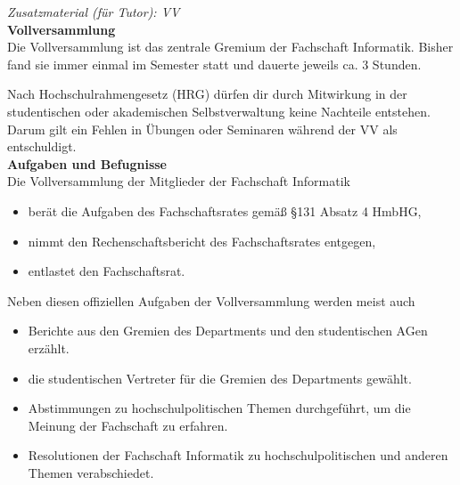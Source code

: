\documentclass[a4paper,11pt]{scrartcl} %
\begin{document}
\begin{framed}
\textit{Zusatzmaterial (für Tutor): VV} \\

\textbf{Vollversammlung} \\

Die Vollversammlung ist das zentrale Gremium der Fachschaft 
Informatik. Bisher fand sie immer einmal im Semester statt und 
dauerte jeweils ca. 3 Stunden. 

Nach Hochschulrahmengesetz (HRG) dürfen dir durch Mitwirkung in 
der studentischen oder akademischen Selbstverwaltung keine 
Nachteile entstehen. Darum gilt ein Fehlen in Übungen oder 
Seminaren während der VV als entschuldigt. \\

\textbf{Aufgaben und Befugnisse} \\

Die Vollversammlung der Mitglieder der Fachschaft Informatik
\begin{itemize}
\item berät die Aufgaben des Fachschaftsrates gemäß §131 Absatz 4 HmbHG,
\item nimmt den Rechenschaftsbericht des Fachschaftsrates entgegen,
\item entlastet den Fachschaftsrat.
\end{itemize}
Neben diesen offiziellen Aufgaben der Vollversammlung werden meist auch
\begin{itemize}
\item Berichte aus den Gremien des Departments und den studentischen AGen erzählt.
\item die studentischen Vertreter für die Gremien des Departments gewählt.
\item Abstimmungen zu hochschulpolitischen Themen durchgeführt, um die Meinung der Fachschaft zu erfahren.
\item Resolutionen der Fachschaft Informatik zu hochschulpolitischen und anderen Themen verabschiedet.
\end{itemize}
\end{framed}
\end{document}
